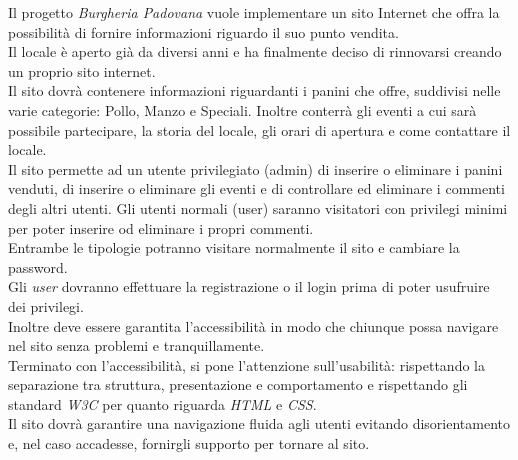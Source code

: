 Il progetto \emph{Burgheria Padovana} vuole implementare un sito Internet che offra la possibilità di fornire informazioni riguardo il suo punto vendita.\\
Il locale è aperto già da diversi anni e ha finalmente deciso di rinnovarsi creando un proprio sito internet.\\
Il sito dovrà contenere informazioni riguardanti i panini che offre, suddivisi nelle varie categorie: Pollo, Manzo e Speciali. 
Inoltre conterrà gli eventi a cui sarà possibile partecipare, la storia del locale, gli orari di apertura e come contattare il locale.\\
Il sito permette ad un utente privilegiato (admin) di inserire o eliminare i panini venduti, di inserire o eliminare gli eventi e di controllare ed eliminare i commenti degli altri utenti. Gli utenti normali (user) saranno visitatori 
con privilegi minimi per poter inserire od eliminare i propri commenti.\\
Entrambe le tipologie potranno visitare normalmente il sito e cambiare la password.\\
Gli \emph{user} dovranno effettuare la registrazione o il login prima di poter usufruire dei privilegi.\\
Inoltre deve essere garantita l'accessibilità in modo che chiunque possa navigare nel sito senza problemi e tranquillamente.\\
Terminato con l'accessibilità, si pone l'attenzione sull'usabilità: rispettando la separazione tra struttura, presentazione e comportamento e rispettando gli standard \emph{W3C} per quanto riguarda \emph{HTML} e \emph{CSS}.\\
Il sito dovrà garantire una navigazione fluida agli utenti evitando disorientamento e, nel caso accadesse, fornirgli supporto per tornare al sito.\\